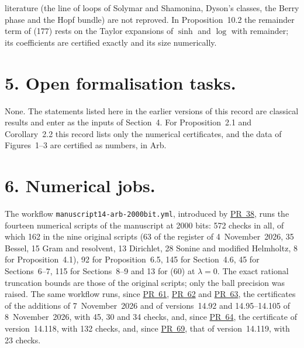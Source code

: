 \documentclass[11pt,a4paper]{article}
\newcommand{\R}{https://github.com/ralfanop/Certifications_Eulerian_polar-curve_computations}
\newcommand{\PR}[1]{\href{\R/pull/#1}{PR~#1}}
\newcommand{\eq}[1]{(#1)}
\begin{document}
literature (the line of loops of Solymar and Shamonina, Dyson's classes, the Berry phase and the Hopf bundle) are not reproved. In Proposition~10.2 the remainder term of \eq{177} rests on the Taylor expansions of $\sinh$ and $\log$ with remainder; its coefficients are certified exactly and its size numerically.

\section*{5. Open formalisation tasks.}
None. The statements listed here in the earlier versions of this record are classical results and enter as the inputs of Section~4. For Proposition~2.1 and Corollary~2.2 this record lists only the numerical certificates, and the data of Figures~1--3 are certified as numbers, in Arb.

\section*{6. Numerical jobs.}
The workflow \texttt{manuscript14-arb-2000bit.yml}, introduced by \PR{38}, runs the fourteen numerical scripts of the manuscript at 2000 bits: 572 checks in all, of which 162 in the nine original scripts (63 of the register of 4~November~2026, 35 Bessel, 15 Gram and resolvent, 13 Dirichlet, 28 Sonine and modified Helmholtz, 8 for Proposition~4.1), 92 for Proposition~6.5, 145 for Section~4.6, 45 for Sections~6--7, 115 for Sections~8--9 and 13 for \eq{60} at $\lambda=0$. The exact rational truncation bounds are those of the original scripts; only the ball precision was raised. The same workflow runs, since \PR{61}, \PR{62} and \PR{63}, the certificates of the additions of 7~November~2026 and of versions~14.92 and 14.95--14.105 of 8~November~2026, with 45, 30 and 34 checks, and, since \PR{64}, the certificate of version~14.118, with 132 checks, and, since \PR{69}, that of version~14.119, with 23 checks.
\end{document}
